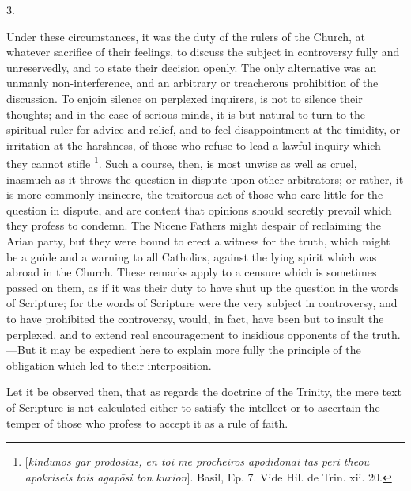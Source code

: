 3.

Under these circumstances, it was the duty of the rulers of the
Church, at whatever sacrifice of their feelings, to discuss the
subject in controversy fully and unreservedly, and to state their
decision openly. The only alternative was an unmanly non-interference,
and an arbitrary or treacherous prohibition of the discussion. To
enjoin silence on perplexed inquirers, is not to silence their
thoughts; and in the case of serious minds, it is but natural to turn
to the spiritual ruler for advice and relief, and to feel
disappointment at the timidity, or irritation at the harshness, of
those who refuse to lead a lawful inquiry which they cannot stifle \footnote{[\emph{kindunos gar prodosias, en t\={o}i
m\={e} procheir\={o}s apodidonai tas peri theou apokriseis tois
agap\={o}si ton kurion}]. Basil, Ep. 7. Vide Hil. de Trin.
xii. 20.}. Such a course, then, is most unwise as well as cruel,
inasmuch as it throws the question in dispute upon other arbitrators;
or rather, it is more commonly insincere, the traitorous act of those
who care little for the question in dispute, and are content that
opinions should secretly prevail which they profess to condemn. The
Nicene Fathers might despair of reclaiming the Arian party, but they
were bound to erect a witness for the truth, which might be a
guide and a warning to all Catholics, against the lying spirit which
was abroad in the Church. These remarks apply to a censure which is
sometimes passed on them, as if it was their duty to have shut up the
question in the words of Scripture; for the words of Scripture were
the very subject in controversy, and to have prohibited the
controversy, would, in fact, have been but to insult the perplexed,
and to extend real encouragement to insidious opponents of the truth.—But
it may be expedient here to explain more fully the principle of the
obligation which led to their interposition.

Let it be observed then, that as regards the doctrine of the
Trinity, the mere text of Scripture is not calculated either to
satisfy the intellect or to ascertain the temper of those who profess
to accept it as a rule of faith.

